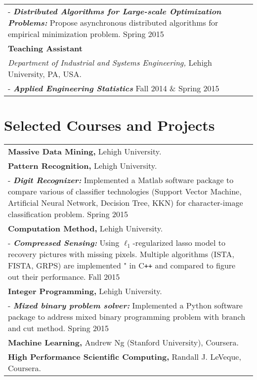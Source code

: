 \documentclass[a4paper,11pt]{article} %
\begin{document}
\begin{tabular}{p{17.5cm}}
\footnotesize{- \textbf{\emph{Distributed Algorithms for Large-scale Optimization Problems:}} Propose asynchronous distributed algorithms for empirical minimization problem. \hfill{Spring 2015}}\\
\textbf{Teaching Assistant} \\
\emph{Department of Industrial and Systems Engineering,} Lehigh University, PA, USA. \\
\footnotesize{- \textbf{\emph{Applied Engineering Statistics}} \hfill{Fall 2014 \& Spring 2015}}\\
\end{tabular}

\section{Selected Courses and Projects}
\begin{tabular}{p{17.5cm}}
    \textbf{Massive Data Mining,} Lehigh University. \\ 
\textbf{Pattern Recognition,} Lehigh University.\\ 
\footnotesize{- \textbf{\emph{Digit Recognizer:}} Implemented a Matlab software package to compare various of classifier technologies (Support Vector Machine, Artificial Neural Network, Decision Tree, KKN) for character-image classification problem.} \hfill{Spring 2015}\\ 
\textbf{Computation Method,} Lehigh University. \\ 
\footnotesize{- \textbf{\emph{Compressed Sensing:}} Using $\ell_1$-regularized lasso model to recovery pictures with missing pixels. Multiple algorithms (ISTA, FISTA, GRPS) are implemented " in C\texttt{++} and compared to figure out their performance.} \hfill{Fall 2015}\\ 
\textbf{Integer Programming,} Lehigh University.\\ 
\footnotesize{- \textbf{\emph{Mixed binary problem solver:}} Implemented a Python software package to address mixed binary programming problem with branch and cut method.} \hfill{Spring 2015}\\ 
\textbf{Machine Learning,} Andrew Ng (Stanford University), Coursera.\\
\textbf{High Performance Scientific Computing,} Randall J. LeVeque, Coursera.
\end{tabular}
\end{document}
